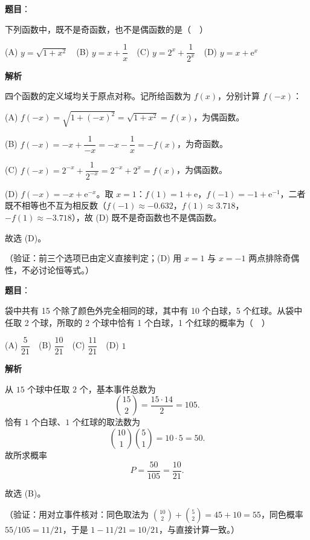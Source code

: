 \begin{answer}

\textbf{题目}：

下列函数中，既不是奇函数，也不是偶函数的是（　）

(A) \(y=\sqrt{1+x^2}\)　(B) \(y=x+\dfrac{1}{x}\)　(C) \(y=2^x+\dfrac{1}{2^x}\)　(D) \(y=x+\mathrm{e}^x\)

\textbf{解析}

四个函数的定义域均关于原点对称。记所给函数为 \(f(x)\)，分别计算 \(f(-x)\)：

(A) \(f(-x)=\sqrt{1+(-x)^2}=\sqrt{1+x^2}=f(x)\)，为偶函数。

(B) \(f(-x)=-x+\dfrac{1}{-x}=-x-\dfrac{1}{x}=-f(x)\)，为奇函数。

(C) \(f(-x)=2^{-x}+\dfrac{1}{2^{-x}}=2^{-x}+2^{x}=f(x)\)，为偶函数。

(D) \(f(-x)=-x+\mathrm{e}^{-x}\)。取 \(x=1\)：\(f(1)=1+\mathrm{e}\)，\(f(-1)=-1+\mathrm{e}^{-1}\)，二者既不相等也不互为相反数（\(f(-1)\approx-0.632\)，\(f(1)\approx3.718\)，\(-f(1)\approx-3.718\)），故 (D) 既不是奇函数也不是偶函数。

故选 (D)。

（验证：前三个选项已由定义直接判定；(D) 用 \(x=1\) 与 \(x=-1\) 两点排除奇偶性，不必讨论恒等式。）


\end{answer}
\begin{answer}

\textbf{题目}：

袋中共有 15 个除了颜色外完全相同的球，其中有 10 个白球，5 个红球。从袋中任取 2 个球，所取的 2 个球中恰有 1 个白球，1 个红球的概率为（　）

(A) \(\dfrac{5}{21}\)　(B) \(\dfrac{10}{21}\)　(C) \(\dfrac{11}{21}\)　(D) \(1\)

\textbf{解析}

从 \(15\) 个球中任取 \(2\) 个，基本事件总数为
\nopagebreak[4]
\[
\binom{15}{2}=\frac{15\cdot14}{2}=105.
\]
恰有 \(1\) 个白球、\(1\) 个红球的取法数为
\nopagebreak[4]
\[
\binom{10}{1}\binom{5}{1}=10\cdot5=50.
\]
故所求概率
\nopagebreak[4]
\[
P=\frac{50}{105}=\frac{10}{21}.
\]

故选 (B)。

（验证：用对立事件核对：同色取法为 \(\binom{10}{2}+\binom{5}{2}=45+10=55\)，同色概率 \(55/105=11/21\)，于是 \(1-11/21=10/21\)，与直接计算一致。）


\end{answer}
